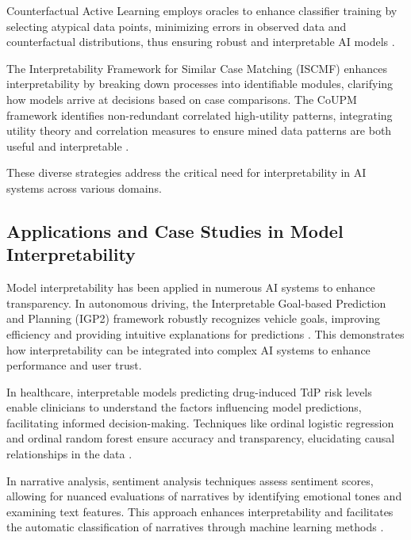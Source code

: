 Counterfactual Active Learning employs oracles to enhance classifier training by selecting atypical data points, minimizing errors in observed data and counterfactual distributions, thus ensuring robust and interpretable AI models \cite{sen2018supervisingfeatureinfluence}. 

The Interpretability Framework for Similar Case Matching (ISCMF) enhances interpretability by breaking down processes into identifiable modules, clarifying how models arrive at decisions based on case comparisons. The CoUPM framework identifies non-redundant correlated high-utility patterns, integrating utility theory and correlation measures to ensure mined data patterns are both useful and interpretable \cite{gan2019correlatedutilitybasedpatternmining}.

These diverse strategies address the critical need for interpretability in AI systems across various domains.

\subsection{Applications and Case Studies in Model Interpretability} \label{subsec:Applications and Case Studies in Model Interpretability}

Model interpretability has been applied in numerous AI systems to enhance transparency. In autonomous driving, the Interpretable Goal-based Prediction and Planning (IGP2) framework robustly recognizes vehicle goals, improving efficiency and providing intuitive explanations for predictions \cite{albrecht2021interpretablegoalbasedpredictionplanning}. This demonstrates how interpretability can be integrated into complex AI systems to enhance performance and user trust.

In healthcare, interpretable models predicting drug-induced TdP risk levels enable clinicians to understand the factors influencing model predictions, facilitating informed decision-making. Techniques like ordinal logistic regression and ordinal random forest ensure accuracy and transparency, elucidating causal relationships in the data \cite{xi2022statisticallearningpreclinicaldrug}.

In narrative analysis, sentiment analysis techniques assess sentiment scores, allowing for nuanced evaluations of narratives by identifying emotional tones and examining text features. This approach enhances interpretability and facilitates the automatic classification of narratives through machine learning methods \cite{jannidis2016analyzingfeaturesdetectionhappy}.

